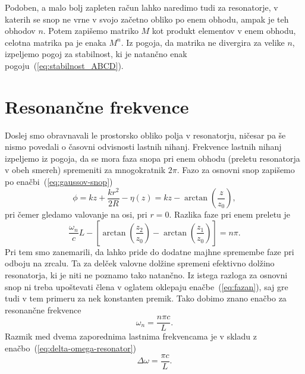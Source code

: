 \begin{remark}
Podoben, a malo bolj zapleten račun lahko naredimo tudi za resonatorje, v katerih se snop 
ne vrne v svojo začetno obliko po enem obhodu, ampak je teh obhodov $n$. Potem zapišemo
matriko $M$ kot produkt elementov v enem obhodu, celotna matrika pa je enaka $M^n$. Iz pogoja,
da matrika ne divergira za velike $n$, izpeljemo pogoj za stabilnost, ki je natančno 
enak pogoju~(\ref{eq:stabilnost_ABCD}). 
\end{remark}

\section{Resonančne frekvence}
Doslej smo obravnavali le prostorsko obliko polja v resonatorju, ničesar pa še nismo
povedali o časovni odvisnosti lastnih nihanj. Frekvence
lastnih nihanj izpeljemo iz pogoja, 
da se mora faza snopa pri enem obhodu
(preletu resonatorja v obeh smereh) spremeniti za mnogokratnik
$2\pi$. Fazo za osnovni snop zapišemo po enačbi~(\ref{eq:gaussov-snop})
\begin{equation}
\phi = kz+\frac{kr^{2}}{2R} -\eta(z) = kz-\arctan \left(\frac{z}{z_{0}}\right),
\label{eq:fazag}
\end{equation}
pri čemer  gledamo valovanje na osi, pri $r=0$. 
Razlika faze pri enem preletu je 
\begin{equation}
\frac{\omega_{n}}{c}L-\left[\arctan \left(\frac{z_{2}}{z_{0}}\right)-
\arctan\left(\frac{z_{1}}{z_{0}}\right)\right]=n\pi.
\label{eq:fazan}
\end{equation}
Pri tem smo zanemarili, da lahko pride do dodatne majhne spremembe
faze pri odboju na zrcalu. Ta za delček valovne dolžine
spremeni efektivno dolžino resonatorja, ki je niti ne poznamo
tako natančno. Iz istega razloga za osnovni snop ni treba upoštevati člena
v oglatem oklepaju enačbe~(\ref{eq:fazan}), saj gre tudi v tem primeru za nek 
konstanten premik. Tako dobimo znano enačbo za resonančne frekvence 
\begin{equation}
\omega_{n}=\frac{n\pi c}{L}.
\label{eq:omega}
\end{equation}
Razmik med dvema zaporednima lastnima frekvencama je v skladu z enačbo~(\ref{eq:delta-omega-resonator})
\begin{equation}
\Delta\omega=\frac{\pi c}{L}.
\label{eq:deltaomega}
\end{equation}

